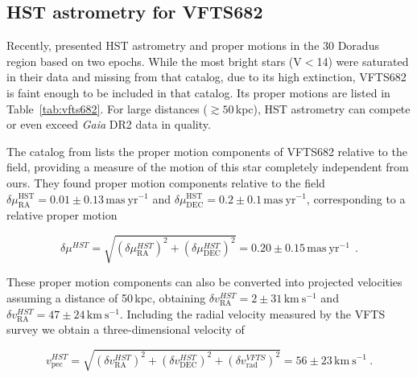 \documentclass[a4paper,fleqn,usenatbib]{mnras}
\newcommand{\kms}{{\,\mathrm{km\ s^{-1}}}}
\DeclareRobustCommand{\Tabref}[1]{Table~\ref{#1}}
\begin{document}
\subsection{HST astrometry for VFTS682}
Recently, \citet{platais:18} presented HST  astrometry and proper
motions in the 30 Doradus region based on two epochs. %
While the most bright stars (V$<$14) were saturated in
their data and missing from that catalog, due to its
high extinction, VFTS682 is faint enough
to be included in that catalog. Its proper motions are
listed in \Tabref{tab:vfts682}. For
large distances ($\gtrsim50$\,kpc), HST astrometry can compete or even
exceed \emph{Gaia} DR2 data in quality.

The catalog from \citet{platais:18} lists the proper motion
components of VFTS682 relative to the field, providing a
measure of the motion of this star completely independent from
ours. They found proper
motion components relative to the field
$\delta\mu_\mathrm{RA}^\mathrm{HST} = 0.01\pm0.13\,\mathrm{mas\
  yr^{-1}}$ and
$\delta\mu_\mathrm{DEC}^\mathrm{HST}=0.2\pm0.1\,\mathrm{mas\
  yr^{-1}}$, corresponding to a relative proper motion 

\begin{equation}
  \label{eq:pm_around_HST}
  \delta \mu^{HST} = \sqrt{\left(\delta\mu_\mathrm{RA}^{HST}\right)^2+\left(\delta\mu_\mathrm{DEC}^{HST}\right)^2}
  = 0.20 \pm 0.15\,\mathrm{mas\
  yr^{-1}} \ \ .
\end{equation}

These proper motion components can also be converted into projected
velocities assuming a distance of 50\,kpc, obtaining $\delta
v_\mathrm{RA}^{HST}=2\pm31\kms$ and $\delta
v_\mathrm{RA}^{HST}=47\pm24\kms$. %
Including the radial velocity
measured by the VFTS survey we obtain a three-dimensional velocity of

\begin{equation}
  \label{eq:speed_around_HST}
  v_\mathrm{pec}^{HST} = \sqrt{\left(\delta v_\mathrm{RA}^{HST}\right)^2
    +\left(\delta v_\mathrm{DEC}^{HST}\right)^2+\left(\delta
      v_\mathrm{rad}^{VFTS}\right)^2} = 56 \pm 23
  \kms \ .
\end{equation}
\end{document}
